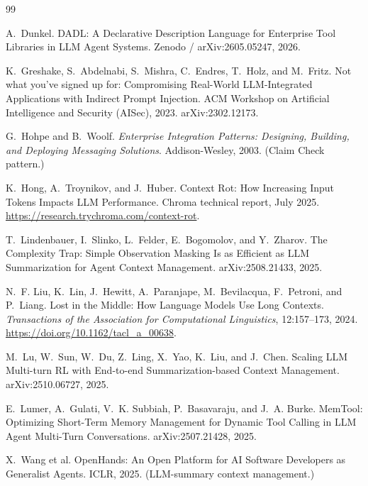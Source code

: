 \documentclass[11pt]{article}
\begin{document}

\begin{thebibliography}{99}

A.~Dunkel.
\newblock DADL: A Declarative Description Language for Enterprise Tool Libraries in LLM Agent Systems.
\newblock Zenodo / arXiv:2605.05247, 2026.

K.~Greshake, S.~Abdelnabi, S.~Mishra, C.~Endres, T.~Holz, and M.~Fritz.
\newblock Not what you've signed up for: Compromising Real-World LLM-Integrated Applications with Indirect Prompt Injection.
\newblock ACM Workshop on Artificial Intelligence and Security (AISec), 2023. arXiv:2302.12173.

G.~Hohpe and B.~Woolf.
\newblock \emph{Enterprise Integration Patterns: Designing, Building, and Deploying Messaging Solutions}.
\newblock Addison-Wesley, 2003. (Claim Check pattern.)

K.~Hong, A.~Troynikov, and J.~Huber.
\newblock Context Rot: How Increasing Input Tokens Impacts LLM Performance.
\newblock Chroma technical report, July 2025. \url{https://research.trychroma.com/context-rot}.

T.~Lindenbauer, I.~Slinko, L.~Felder, E.~Bogomolov, and Y.~Zharov.
\newblock The Complexity Trap: Simple Observation Masking Is as Efficient as LLM Summarization for Agent Context Management.
\newblock arXiv:2508.21433, 2025.

N.~F. Liu, K.~Lin, J.~Hewitt, A.~Paranjape, M.~Bevilacqua, F.~Petroni, and P.~Liang.
\newblock Lost in the Middle: How Language Models Use Long Contexts.
\newblock \emph{Transactions of the Association for Computational Linguistics}, 12:157--173, 2024. \url{https://doi.org/10.1162/tacl_a_00638}.

M.~Lu, W.~Sun, W.~Du, Z.~Ling, X.~Yao, K.~Liu, and J.~Chen.
\newblock Scaling LLM Multi-turn RL with End-to-end Summarization-based Context Management.
\newblock arXiv:2510.06727, 2025.

E.~Lumer, A.~Gulati, V.~K. Subbiah, P.~Basavaraju, and J.~A. Burke.
\newblock MemTool: Optimizing Short-Term Memory Management for Dynamic Tool Calling in LLM Agent Multi-Turn Conversations.
\newblock arXiv:2507.21428, 2025.

X.~Wang et al.
\newblock OpenHands: An Open Platform for AI Software Developers as Generalist Agents.
\newblock ICLR, 2025. (LLM-summary context management.)


\end{thebibliography}
\end{document}
